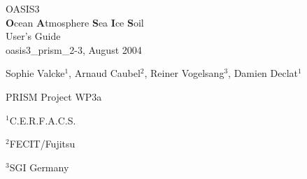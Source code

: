\newpage
\thispagestyle{empty}
\vspace{50mm}




\vspace*{0.5cm}
{\Large
   \begin{center}
      OASIS3\\
      {\bf O}cean {\bf A}tmosphere {\bf S}ea  {\bf I}ce  {\bf S}oil\\
      \vspace{0.4cm}
      User's Guide \\
      \vspace{0.4cm}
      {\large oasis3\_prism\_2-3, August 2004}

   \end{center}
}

\vspace*{1cm}

\centerline{Sophie Valcke$^1$, Arnaud Caubel$^2$, Reiner
  Vogelsang$^3$, Damien Declat$^1$}

\vspace*{1cm}
\centerline{PRISM Project WP3a}
\centerline{$^1$C.E.R.F.A.C.S.} 
\centerline{$^2$FECIT/Fujitsu}
\centerline{$^3$SGI Germany}

\begin{abstract}
This User's Guide contains a detailed step-by-step description on 
how to realize a coupled simulation with OASIS3.

The aim of OASIS3 is to provide a flexible and user friendly tool 
for coupling independent
general circulation models of the atmosphere and the ocean (A/O-GCMs) 
as well as other climate component models (sea-ice, land,
atmospheric chemistry, ocean biogeochemistry, ...) and regional models. 
The resulting coupled models are necessary tools to tackle
current climatic paradigms such as the natural variability, 
El Ni\~no Southern Oscillation
(ENSO) or the greenhouse gas global warming effect. 

OASIS3 synchronizes the exchanges of coupling fields between 
the models being coupled, and performs 
2D interpolations and transformations needed to express, on the grid
of the target model, the coupling
fields produced by the source model on its grid. Modularity and
flexibility have been particularly emphasized in OASIS3 design.

\end{abstract}
